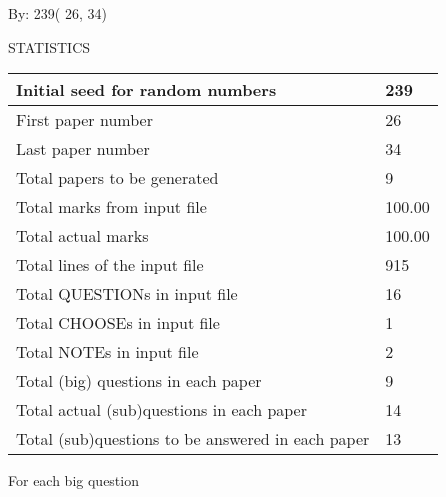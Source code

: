 \documentclass[12pt]{article}
\begin{document}
   
\hspace{1.0in} By: 
         239(         26,          34)
   
   
   
\vspace{0.2in}
\vspace{0.2in}
   
   
 \newpage
\setcounter{page}{1} 
   
   
 {\LARGE{STATISTICS}}
   
\vspace{0.2in}
   
 \begin{tabular}{|l|l|}
 \hline
 Initial seed for random numbers &        239 \\
\hline
 First paper number &         26 \\
\hline
 Last  paper number &         34 \\
\hline
 Total papers to be generated &          9 \\
\hline
Total marks from input file & 100.00 \\
\hline
Total actual marks & 100.00 \\
\hline
 Total lines of the input file &        915 \\
 \hline
 Total QUESTIONs in input file &         16 \\
\hline
 Total CHOOSEs in input file &          1 \\
\hline
 Total NOTEs in input file &          2 \\
\hline
 Total (big) questions in each paper &          9 \\
\hline
 Total actual (sub)questions in each paper &         14 \\
\hline
 Total (sub)questions to be answered in each paper &         13 \\
\hline
 \end{tabular}
   
   
 \newpage
   
{\LARGE{For each big question}}
   
   
\vspace{0.2in}
   
\end{document}
